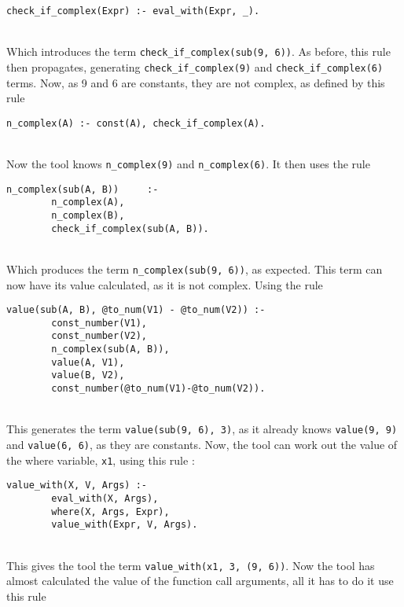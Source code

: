 \begin{lstlisting}[firstnumber=149]
check_if_complex(Expr) :- eval_with(Expr, _).
\end{lstlisting}
\mbox{} \\
Which introduces the term \lstinline{check_if_complex(sub(9, 6))}. As before, this rule then propagates, generating \lstinline{check_if_complex(9)} and \lstinline{check_if_complex(6)} terms. Now, as 9 and 6 are constants, they are not complex, as defined by this rule \\ %

\begin{lstlisting}[firstnumber=172]
n_complex(A) :- const(A), check_if_complex(A).
\end{lstlisting}
\mbox{} \\
Now the tool knows \lstinline{n_complex(9)} and \lstinline{n_complex(6)}. It then uses the rule \\ %

\begin{lstlisting}[firstnumber=181]
n_complex(sub(A, B))     :- 
		n_complex(A), 
		n_complex(B), 
		check_if_complex(sub(A, B)).
\end{lstlisting}
\mbox{} \\
Which produces the term \lstinline{n_complex(sub(9, 6))}, as expected. This term can now have its value calculated, as it is not complex. Using the rule \\ %

\begin{lstlisting}[firstnumber=197]
value(sub(A, B), @to_num(V1) - @to_num(V2)) :- 
		const_number(V1), 
		const_number(V2), 
		n_complex(sub(A, B)), 
		value(A, V1), 
		value(B, V2), 
		const_number(@to_num(V1)-@to_num(V2)).
\end{lstlisting}
\mbox{} \\
This generates the term \lstinline{value(sub(9, 6), 3)}, as it already knows \lstinline{value(9, 9)} and \lstinline{value(6, 6)}, as they are constants. Now, the tool can work out the value of the where variable, \lstinline{x1}, using this rule : \\

\begin{lstlisting}[firstnumber=90]
value_with(X, V, Args) :- 
		eval_with(X, Args), 
		where(X, Args, Expr), 
		value_with(Expr, V, Args).
\end{lstlisting}
\mbox{} \\
This gives the tool the term \lstinline{value_with(x1, 3, (9, 6))}. Now the tool has almost calculated the value of the function call arguments, all it has to do it use this rule \\%


